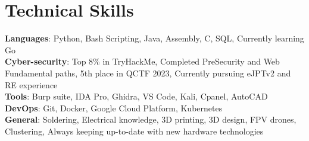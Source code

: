 \section{Technical Skills}

\begin{itemize}[leftmargin=0.15in, label={}]
    \small{\item{
        \textbf{Languages}{: Python, Bash Scripting, Java, Assembly, C, SQL, Currently learning Go} \\ \vspace{1.5mm}
        \textbf{Cyber-security}{: Top 8\% in TryHackMe, Completed PreSecurity and Web Fundamental paths, 5th place in QCTF 2023, Currently pursuing eJPTv2 and RE experience} \\ \vspace{1.5mm}
        \textbf{Tools}{: Burp suite, IDA Pro, Ghidra, VS Code, Kali, Cpanel, AutoCAD} \\ \vspace{1.5mm}
        \textbf{DevOps}{: Git, Docker, Google Cloud Platform, Kubernetes}\\ \vspace{1.5mm}
        \textbf{General}{: Soldering, Electrical knowledge, 3D printing, 3D design, FPV drones, Clustering, Always keeping up-to-date with new hardware technologies}\\

    }}
\end{itemize}